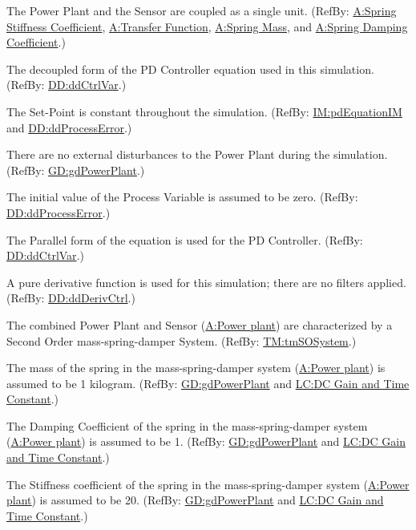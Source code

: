 \documentclass[12pt]{article}
\begin{document}
\begin{description}[font=\normalfont]
\item[Power plant:\phantomsection\label{pwrPlant}]{The Power Plant and the Sensor are coupled as a single unit. (RefBy: \hyperref[stiffnessCoeffSpring]{A:Spring Stiffness Coefficient}, \hyperref[pwrPlantTxFnx]{A:Transfer Function}, \hyperref[massSpring]{A:Spring Mass}, and \hyperref[dampingCoeffSpring]{A:Spring Damping Coefficient}.)}
\item[Decoupled equation:\phantomsection\label{decoupled}]{The decoupled form of the PD Controller equation used in this simulation. (RefBy: \hyperref[DD:ddCtrlVar]{DD:ddCtrlVar}.)}
\item[Set-Point:\phantomsection\label{setPointConstant}]{The Set-Point is constant throughout the simulation. (RefBy: \hyperref[IM:pdEquationIM]{IM:pdEquationIM} and \hyperref[DD:ddProcessError]{DD:ddProcessError}.)}
\item[External disturbance:\phantomsection\label{externalDisturb}]{There are no external disturbances to the Power Plant during the simulation. (RefBy: \hyperref[GD:gdPowerPlant]{GD:gdPowerPlant}.)}
\item[Initial Value:\phantomsection\label{initialValue}]{The initial value of the Process Variable is assumed to be zero. (RefBy: \hyperref[DD:ddProcessError]{DD:ddProcessError}.)}
\item[Parallel Equation:\phantomsection\label{parallelEq}]{The Parallel form of the equation is used for the PD Controller. (RefBy: \hyperref[DD:ddCtrlVar]{DD:ddCtrlVar}.)}
\item[Unfiltered Derivative:\phantomsection\label{unfilteredDerivative}]{A pure derivative function is used for this simulation; there are no filters applied. (RefBy: \hyperref[DD:ddDerivCtrl]{DD:ddDerivCtrl}.)}
\item[Transfer Function:\phantomsection\label{pwrPlantTxFnx}]{The combined Power Plant and Sensor (\hyperref[pwrPlant]{A:Power plant}) are characterized by a Second Order mass-spring-damper System. (RefBy: \hyperref[TM:tmSOSystem]{TM:tmSOSystem}.)}
\item[Spring Mass:\phantomsection\label{massSpring}]{The mass of the spring in the mass-spring-damper system (\hyperref[pwrPlant]{A:Power plant}) is assumed to be 1 kilogram. (RefBy: \hyperref[GD:gdPowerPlant]{GD:gdPowerPlant} and \hyperref[likeChgPP]{LC:DC Gain and Time Constant}.)}
\item[Spring Damping Coefficient:\phantomsection\label{dampingCoeffSpring}]{The Damping Coefficient of the spring in the mass-spring-damper system (\hyperref[pwrPlant]{A:Power plant}) is assumed to be 1. (RefBy: \hyperref[GD:gdPowerPlant]{GD:gdPowerPlant} and \hyperref[likeChgPP]{LC:DC Gain and Time Constant}.)}
\item[Spring Stiffness Coefficient:\phantomsection\label{stiffnessCoeffSpring}]{The Stiffness coefficient of the spring in the mass-spring-damper system (\hyperref[pwrPlant]{A:Power plant}) is assumed to be 20. (RefBy: \hyperref[GD:gdPowerPlant]{GD:gdPowerPlant} and \hyperref[likeChgPP]{LC:DC Gain and Time Constant}.)}
\end{description}
\end{document}
